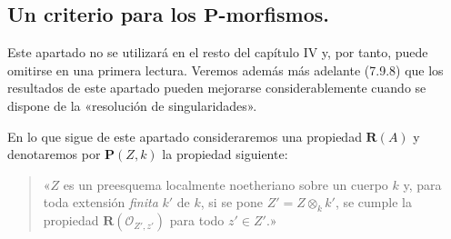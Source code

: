 \subsection{Un criterio para los $\boldsymbol P$-morfismos.}
\label{subsection:IV.7.5-fr}

\begin{env}[7.5.0]
\label{IV.2.s7.5.0-fr}
Este apartado no se utilizará en el resto del capítulo IV y, por tanto,
puede omitirse en una primera lectura. Veremos además más adelante
(7.9.8) que los resultados de este apartado pueden mejorarse
considerablemente cuando se dispone de la «resolución de
singularidades».

En lo que sigue de este apartado consideraremos una propiedad
$\boldsymbol R(A)$ y denotaremos por $\boldsymbol P(Z,k)$ la propiedad
siguiente:
\begin{quote}
«$Z$ es un preesquema localmente noetheriano sobre un cuerpo $k$ y, para
toda extensión \emph{finita} $k'$ de $k$, si se pone $Z'=Z\otimes_k k'$, se
cumple la propiedad $\boldsymbol R(\mathscr O_{Z',z'})$ para todo
$z'\in Z'$.»
\end{quote}
\end{env}
